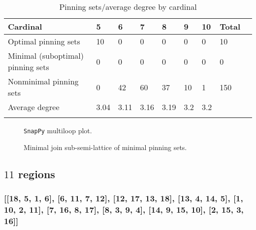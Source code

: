 \documentclass{article}%
\begin{document}
\begin{table}[ht]
	\caption{Pinning sets/average degree by cardinal}
	\centering
	\renewcommand{\arraystretch}{1.5}
	\begin{tabularx}{\textwidth}{lXXXXXXXX}
		\toprule
			Cardinal & 5 & 6 & 7 & 8 & 9 & 10 & Total\\
			\hline
			Optimal pinning sets & 10 & 0 & 0 & 0 & 0 & 0 & 10 \\
			Minimal (suboptimal) pinning sets & 0 & 0 & 0 & 0 & 0 & 0 & 0 \\
			Nonminimal pinning sets & 0 & 42 & 60 & 37 & 10 & 1 & 150 \\
			Average degree & 3.04 & 3.11 & 3.16 & 3.19 & 3.2 & 3.2 &  \\
		\bottomrule \\ 
	\end{tabularx}
\end{table}

\begin{multicols}{2}
\begin{figure}[H]
\centering

\caption{\texttt{SnapPy} multiloop plot.}
\label{fig:tex/img/[[5, 16, 6, 1], [9, 4, 10, 5], [10, 15, 11, 16], [6, 11, 7, 12], [1, 12, 2, 13], [13, 8, 14, 9], [14, 3, 15, 4], [7, 3, 8, 2]].svg}
\end{figure}
\columnbreak

\begin{figure}[H]
\centering
\scalebox{0.8}{}
\caption{Minimal join sub-semi-lattice of minimal pinning sets.}
\label{fig:tex/img/[[5, 16, 6, 1], [9, 4, 10, 5], [10, 15, 11, 16], [6, 11, 7, 12], [1, 12, 2, 13], [13, 8, 14, 9], [14, 3, 15, 4], [7, 3, 8, 2]].pgf}
\end{figure}
\end{multicols}

\newpage

\subsection{$11$ regions}

\subsubsection{[[18, 5, 1, 6], [6, 11, 7, 12], [12, 17, 13, 18], [13, 4, 14, 5], [1, 10, 2, 11], [7, 16, 8, 17], [8, 3, 9, 4], [14, 9, 15, 10], [2, 15, 3, 16]]}
\end{document}
